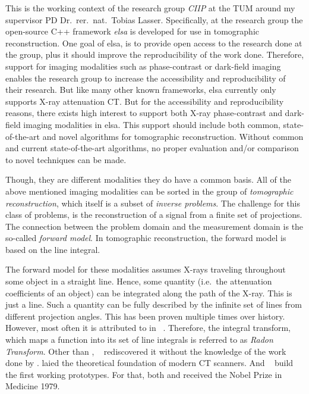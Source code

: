This is the working context of the research group \textit{\gls{CIIP}} at the \gls{TUM} around my
supervisor PD Dr.\ rer.\ nat.\ Tobias Lasser. Specifically, at the research group the open-source
C++ framework \textit{elsa} is developed for use in tomographic reconstruction. One goal of elsa, is
to provide open access to the research done at the group, plus it should improve the reproducibility
of the work done. Therefore, support for imaging modalities such as phase-contrast or dark-field
imaging enables the research group to increase the accessibility and reproducibility of their
research. But like many other known frameworks, elsa currently only supports X-ray attenuation CT\@.
But for the accessibility and reproducibility reasons, there exists high interest to support both
X-ray phase-contrast and dark-field imaging modalities in elsa. This support should include both
common, state-of-the-art and novel algorithms for tomographic reconstruction. Without common and
current state-of-the-art algorithms, no proper evaluation and/or comparison to novel techniques can
be made.

Though, they are different modalities they do have a common basis. All of the above mentioned
imaging modalities can be sorted in the group of \textit{tomographic reconstruction}, which itself
is a subset of \textit{inverse problems}. The challenge for this class of problems, is the
reconstruction of a signal from a finite set of projections. The connection between the problem
domain and the measurement domain is the so-called \textit{forward model}. In tomographic
reconstruction, the forward model is based on the line integral.

The forward model for these modalities assumes X-rays traveling throughout some object in a straight
line. Hence, some quantity (i.e.\ the attenuation coefficients of an object) can be integrated along
the path of the X-ray. This is just a line. Such a quantity can be fully described by the infinite
set of lines from different projection angles. This has been proven multiple times over history.
However, most often it is attributed to \citeauthor*{radon_uber_1917} in \citeyear{radon_uber_1917}
~\cite{radon_uber_1917}. Therefore, the integral transform, which maps a function into its set of
line integrals is referred to as \textit{Radon Transform}. Other than \citeauthor*{radon_uber_1917},
\citeauthor*{cormack_representation_1963}~\cite{cormack_representation_1963} rediscovered it without
the knowledge of the work done by \citeauthor*{radon_uber_1917}.
\citeauthor*{cormack_representation_1963} laied the theoretical foundation of modern CT scanners.
And \citeauthor*{hounsfield_computerized_1973}~\cite{hounsfield_computerized_1973} build the first
working prototypes. For that, both \citeauthor*{cormack_representation_1963} and
\citeauthor*{hounsfield_computerized_1973} received the Nobel Prize in Medicine 1979.

